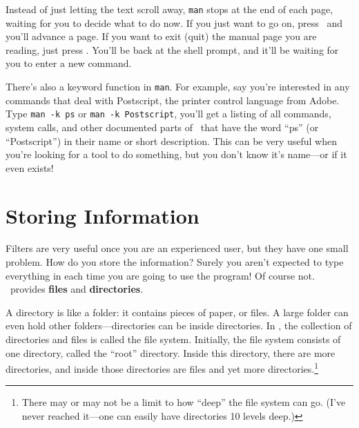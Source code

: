 Instead of just letting the text scroll away, {\tt man} stops at the
end of each page, waiting for you to decide what to do now. If you
just want to go on, press \ and you'll advance a page. If
you want to exit (quit) the manual page you are reading, just press
. You'll be back at the shell prompt, and it'll be waiting for
you to enter a new command.

There's also a keyword function in {\tt man}. For example, say you're
interested in any commands that deal with Postscript, the printer
control language from Adobe. Type {\tt man -k ps} or {\tt man -k
  Postscript}, you'll get a listing of all commands, system calls, and
other documented parts of \unix\ that have the word ``ps'' (or
``Postscript'') in their name or short description. This can be very
useful when you're looking for a tool to do something, but you don't
know it's name---or if it even exists!


\section{Storing Information}

Filters are very useful once you are an experienced user, but they
have one small problem.  How do you store the information?  Surely you
aren't expected to type everything in each time you are going to use
the program! Of course not. \unix\ provides {\bf files} and {\bf
  directories}.

A directory is like a folder: it contains pieces of paper, or files.
A large folder can even hold other folders---directories can be inside
directories.  In \unix, the collection of directories and files is
called the file system. Initially, the file system
consists of one directory, called the ``root''
directory. Inside this directory, there are more
directories, and inside those directories are files and yet more
directories.\footnote{There may or may not be a limit to how ``deep''
  the file system can go.  (I've never reached it---one can easily
  have directories 10 levels deep.)}

